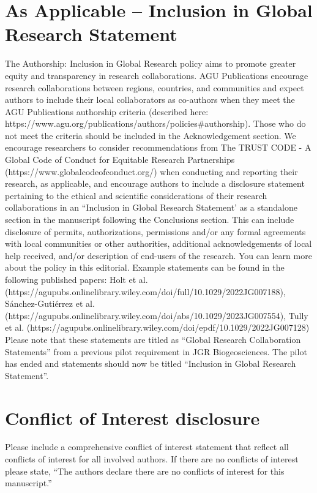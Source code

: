 \documentclass[draft]{agujournal2019}
\begin{document}
\section*{As Applicable – Inclusion in Global Research Statement}
The Authorship: Inclusion in Global Research policy aims to promote greater equity and transparency in research collaborations. AGU Publications encourage research collaborations between regions, countries, and communities and expect authors to include their local collaborators as co-authors when they meet the AGU Publications authorship criteria (described here: https://www.agu.org/publications/authors/policies\#authorship). Those who do not meet the criteria should be included in the Acknowledgement section. We encourage researchers to consider recommendations from The TRUST CODE - A Global Code of Conduct for Equitable Research Partnerships (https://www.globalcodeofconduct.org/) when conducting and reporting their research, as applicable, and encourage authors to include a disclosure statement pertaining to the ethical and scientific considerations of their research collaborations in an “Inclusion in Global Research Statement’ as a standalone section in the manuscript following the Conclusions section. This can include disclosure of permits, authorizations, permissions and/or any formal agreements with local communities or other authorities, additional acknowledgements of local help received, and/or description of end-users of the research. You can learn more about the policy in this editorial. Example statements can be found in the following published papers: 
Holt et al. (https://agupubs.onlinelibrary.wiley.com/doi/full/10.1029/2022JG007188), 
Sánchez-Gutiérrez et al. (https://agupubs.onlinelibrary.wiley.com/doi/abs/10.1029/2023JG007554), 
Tully et al. (https://agupubs.onlinelibrary.wiley.com/doi/epdf/10.1029/2022JG007128) 
Please note that these statements are titled as “Global Research Collaboration Statements” from a previous pilot requirement in JGR Biogeosciences. The pilot has ended and statements should now be titled “Inclusion in Global Research Statement”.

\section*{Conflict of Interest disclosure}
Please include a comprehensive conflict of interest statement that reflect all conflicts of interest for all involved authors. If there are no conflicts of interest please state, “The authors declare there are no conflicts of interest for this manuscript.”
\end{document}
